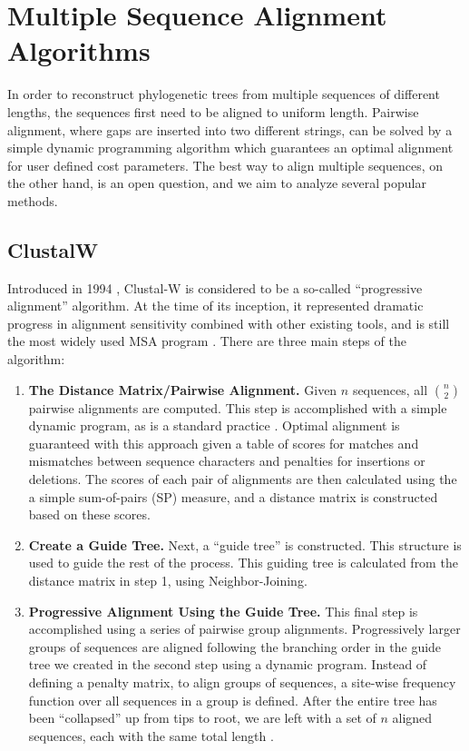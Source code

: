 \documentclass[10pt,twocolumn]{article}
\begin{document}
\section*{Multiple Sequence Alignment Algorithms}
In order to reconstruct phylogenetic trees from multiple sequences of different lengths, the sequences first need to be aligned to uniform length. Pairwise alignment, where gaps are inserted into two different strings, can be solved by a simple dynamic programming algorithm which guarantees an optimal alignment for user defined cost parameters. The best way to align multiple sequences, on the other hand, is an open question, and we aim to analyze several popular methods.

\subsection*{ClustalW}
Introduced in 1994 \cite{thompson1994clustal}, Clustal-W is considered to be a so-called ``progressive alignment'' algorithm. At the time of its inception, it represented dramatic progress in alignment sensitivity combined with other existing tools, and is still the most widely used MSA program \cite{edgar2006multiple}. There are three main steps of the algorithm:

\begin{enumerate}
  \item \textbf{The Distance Matrix/Pairwise Alignment.} Given $n$ sequences, all $\binom{n}{2}$ pairwise alignments are computed. This step is accomplished with a simple dynamic program, as is a standard practice \cite{thompson1994clustal}. Optimal alignment is guaranteed with this approach given a table of scores for matches and mismatches between sequence characters and penalties for insertions or deletions. The scores of each pair of alignments are then calculated using the a simple sum-of-pairs (SP) measure, and a distance matrix is constructed based on these scores.
  \item \textbf{Create a Guide Tree.} Next, a ``guide tree'' is constructed. This structure is used to guide the rest of the process. This guiding tree is calculated from the distance matrix in step 1, using Neighbor-Joining.
  \item \textbf{Progressive Alignment Using the Guide Tree.} This final step is accomplished using a series of pairwise group alignments. Progressively larger groups of sequences are aligned following the branching order in the guide tree we created in the second step using a dynamic program. Instead of defining a penalty matrix, to align groups of sequences, a site-wise frequency function over all sequences in a group is defined. After the entire tree has been ``collapsed'' up from tips to root, we are left with a set of $n$ aligned sequences, each with the same total length \cite{thompson1994clustal}.
\end{enumerate}
\end{document}
